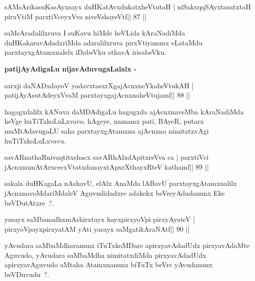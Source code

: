 \begin{shl}
sAMsArikasuKasAyxsayx duHKatAvxdukatxheVtutaH |
niSakxqqSAyxtasatxtaH pirxVtiM parxtiVceyxVva niveVshayeVtf\hfill || 87 ||
\end{shl}

\begin{artha}
saMsAradalilxruva I suKavu hiMde heVLida kAraNadiMda duHKakaravAdadxriMda adaralilxruva pirxVtiyanunx eLataMdu parxtayxgAtamxnalelx iDabeVku athavA irisabeVku.
\end{artha}

\begin{artha}
\textbf{patijAyAdigaLu nijavAduvugaLalalx -}
\end{artha}

\begin{shl}
sarxji daNADxdayoV yadavxtasxrXgajAcnxneYkaheVtukAH |
patijAyAsutAdeyxVvaM parxtayxgajAcnxnaheVtujamf\hfill || 88 ||
\end{shl}

\begin{artha}
hagagxdalilx kANuva daMDAdigaLu hagagxda ajAcnxnaveMba kAraNadiMda heVge huTiTxkoLuLxvavo, hAgeye, namamx pati, BAyeR, putarx muMtAdavugaLU saha parxtayxgAtamxna ajAcnxna nimitatxvAgi huTiTxkoLuLxvavu.
\end{artha}

\begin{shl}
savARnathaRnivaqtitxshacx savARhAlxdApitxreVva ca |
parxtiVci jAcnxnamAtArxcecxVtatxdanayxtApxrXthayxRteV kathamf\hfill || 89 ||
\end{shl}

\begin{artha}
sakala duHKagaLa nAshavU, elAlx AnaMda lABavU parxtayxgAtamxnalilx
jAcnxnavoMdariMdaleV Aguvudidadxre adakekx beVreyAdudanunx Eke
beVDutAtxre~?.
\end{artha}

\begin{shl}
yasayx saMbanadhxmAshirxtayx hayxpirxyoV\s pi pirxyAyateV |
pirxyoV\s payxpirxyatAM yAti yasayx saMgatikAraNAtf\hfill || 90 ||
\end{shl}

\begin{artha}
yAvudara saMbaMdhavanunx iTuTxkoMDare apirxyavAdadUdx pirxyavAdaMte Aguvudo, yAvudara saMbaMdha nimitatxdiMda pirxyavAdadUdx apirxyavAguvudo aMtaha Atamxnanunx biTuTx beVre yAvudanunx beVDuvudu~?.
\end{artha}



